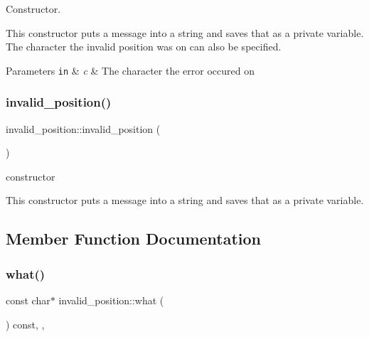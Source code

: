 Constructor. 

This constructor puts a message into a string and saves that as a private variable. The character the invalid position was on can also be specified.


\begin{DoxyParams}[1]{Parameters}
\mbox{\tt in}  & {\em c} & The character the error occured on \\
\hline
\end{DoxyParams}
\mbox{\label{classinvalid__position_aabeae0fae84fada6af68ff83a68c6542}} 
\subsubsection{\texorpdfstring{invalid\+\_\+position()}{invalid\_position()}\hspace{0.1cm}{\footnotesize\ttfamily [2/2]}}
{\footnotesize\ttfamily invalid\+\_\+position\+::invalid\+\_\+position (\begin{DoxyParamCaption}{ }\end{DoxyParamCaption})\hspace{0.3cm}{\ttfamily [inline]}}



constructor 

This constructor puts a message into a string and saves that as a private variable. 

\subsection{Member Function Documentation}
\mbox{\label{classinvalid__position_a7de16130368fed8546deef6713025cfa}} 
\subsubsection{\texorpdfstring{what()}{what()}}
{\footnotesize\ttfamily const char$\ast$ invalid\+\_\+position\+::what (\begin{DoxyParamCaption}{ }\end{DoxyParamCaption}) const\hspace{0.3cm}{\ttfamily [inline]}, {\ttfamily [override]}, {\ttfamily [noexcept]}}



